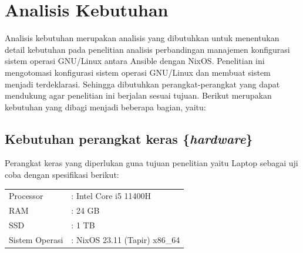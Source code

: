 \documentclass[10pt,]{report}
\begin{document}
\section{Analisis Kebutuhan}
\vspace{-3mm}
\begin{adjustwidth}{20pt}{}
	Analisis kebutuhan merupakan analisis yang dibutuhkan untuk menentukan detail
	kebutuhan pada penelitian analisis perbandingan manajemen konfigurasi sistem
	operasi GNU/Linux antara Ansible dengan NixOS. Penelitian ini mengotomasi
	konfigurasi sistem operasi GNU/Linux dan membuat sistem menjadi terdeklarasi.
	Sehingga dibutuhkan perangkat-perangkat yang dapat mendukung agar penelitian
	ini berjalan sesuai tujuan. Berikut merupakan kebutuhan yang dibagi menjadi
	beberapa bagian, yaitu:
\end{adjustwidth}
\begin{adjustwidth}{20pt}{}
	\subsection{Kebutuhan perangkat keras \{\textit{hardware}\}}
	\vspace{-2mm}
	\begin{adjustwidth}{20pt}{}
		Perangkat keras yang diperlukan guna tujuan penelitian yaitu Laptop sebagai
		uji coba dengan spesifikasi berikut:
	\end{adjustwidth}
	\begin{adjustwidth}{4mm}{}
		\begin{tabular}{ll}
			Processor      & : Intel Core i5 11400H        \\
			RAM            & : 24 GB                       \\
			SSD            & : 1 TB                        \\
			Sistem Operasi & : NixOS 23.11 (Tapir) x86\_64 \\
		\end{tabular}
	\end{adjustwidth}
\end{adjustwidth}
\end{document}
